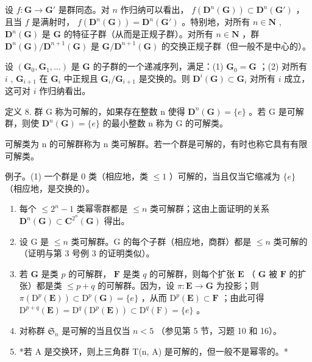 设 \(f: \mathbf{G} \to \mathbf{G}'\) 是群同态。对 \(n\) 作归纳可以看出， \(f(\mathbf{D}^n(\mathbf{G})) \subset \mathbf{D}^n(\mathbf{G}')\) ，且当 \(f\) 是满射时， \(f(\mathbf{D}^n(\mathbf{G})) = \mathbf{D}^n(\mathbf{G}')\) 。特别地，对所有 \(n \in \mathbf{N}\) , \(\mathbf{D}^n(\mathbf{G})\) 是 \(\mathbf{G}\) 的特征子群（从而是正规子群）。对所有 \(n \in \mathbf{N}\) ，群 \(\mathbf{D}^n(\mathbf{G}) / \mathbf{D}^{n+1}(\mathbf{G})\) 是 \(\mathbf{G} / \mathbf{D}^{n+1}(\mathbf{G})\) 的交换正规子群（但一般不是中心的）。

设 \((\mathbf{G}_0, \mathbf{G}_1, \ldots)\) 是 \(\mathbf{G}\) 的子群的一个递减序列，满足：(1) \(\mathbf{G}_0 = \mathbf{G}\) ；(2) 对所有 \(i\) , \(\mathbf{G}_{i+1}\) 在 \(\mathbf{G}_i\) 中正规且 \(\mathbf{G}_i / \mathbf{G}_{i+1}\) 是交换的。则 \(\mathbf{D}^i(\mathbf{G}) \subset \mathbf{G}_i\) 对所有 \(i\) 成立，这可对 \(i\) 作归纳看出。

定义 8. 群 G 称为可解的，如果存在整数 n 使得 \(\mathbf{D}^{n}(\mathbf{G})=\{e\}\) 。若 G 是可解群，则使 \(\mathbf{D}^{n}(\mathbf{G})=\{e\}\) 的最小整数 n 称为 G 的可解类。

可解类为 n 的可解群称为 n 类可解群。若一个群是可解的，有时也称它具有有限可解类。

例子。(1) 一个群是 0 类（相应地，类 \(\leqslant 1\) ）可解的，当且仅当它缩减为 \(\{e\}\) （相应地，是交换的）。

\begin{enumerate}
\def\labelenumi{(\arabic{enumi})}
\setcounter{enumi}{1}
\item
  每个 \(\leqslant 2^{n} - 1\) 类幂零群都是 \(\leqslant n\) 类可解群；这由上面证明的关系 \(\mathbf{D}^n (\mathbf{G})\subset \mathbf{C}^{2^n}(\mathbf{G})\) 得出。
\item
  设 G 是 \(\leqslant n\) 类可解群。G 的每个子群（相应地，商群）都是 \(\leqslant n\) 类可解的（证明与第 3 号例 3 的证明类似）。
\item
  若 \(\mathbf{G}\) 是类 \(p\) 的可解群， \(\mathbf{F}\) 是类 \(q\) 的可解群，则每个扩张 \(\mathbf{E}\) （ \(\mathbf{G}\) 被 \(\mathbf{F}\) 的扩张）都是类 \(\leqslant p + q\) 的可解群。因为，设 \(\pi: \mathbf{E} \to \mathbf{G}\) 为投影；则 \(\pi(\mathrm{D}^p(\mathbf{E})) \subset \mathrm{D}^p(\mathbf{G}) = \{e\}\) ，从而 \(\mathrm{D}^p(\mathbf{E}) \subset \mathbf{F}\) ；由此可得 \(\mathrm{D}^{p+q}(\mathbf{E}) = \mathrm{D}^q(\mathrm{D}^p(\mathbf{E})) \subset \mathrm{D}^q(\mathrm{F}) = \{e\}\) 。
\item
  对称群 \(\mathfrak{S}_n\) 是可解的当且仅当 \(n < 5\) （参见第 5 节，习题 10 和 16）。
\item
  *若 A 是交换环，则上三角群 T(n, A) 是可解的，但一般不是幂零的。*
\end{enumerate}

